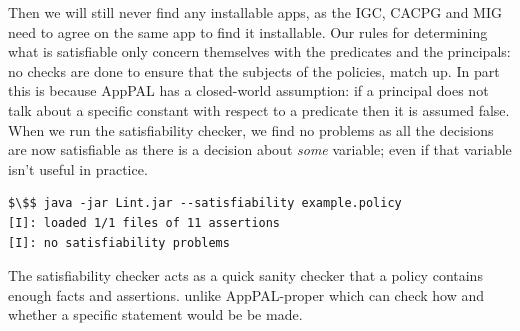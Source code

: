 \documentclass[thesis.tex]{subfiles}
\begin{document}
Then we will still never find any installable apps, as the \ac{IGC}, \ac{CACPG}
and \ac{MIG} need to agree on the same app to find it installable. Our rules for
determining what is satisfiable only concern themselves with the predicates and
the principals: no checks are done to ensure that the subjects of the policies,
match up. In part this is because AppPAL has a closed-world assumption: if a
principal does not talk about a specific constant with respect to a predicate
then it is assumed false. When we run the satisfiability checker, we find no
problems as all the decisions are now satisfiable as there is a decision about
\emph{some} variable; even if that variable isn't useful in practice.

\begin{lstlisting}
$\$$ java -jar Lint.jar --satisfiability example.policy
[I]: loaded 1/1 files of 11 assertions
[I]: no satisfiability problems
\end{lstlisting}

The satisfiability checker acts as a quick sanity checker that a policy contains
enough facts and assertions. unlike AppPAL-proper which can check how and
whether a specific statement would be be made.  

%
\end{document}
